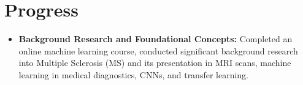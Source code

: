\documentclass[11pt]{article}
\begin{document}
\section*{Progress}\label{progress}
\begin{itemize}
    \item \textbf{Background Research and Foundational Concepts:} Completed an online machine learning course, conducted significant background research into Multiple Sclerosis (MS) and its presentation in MRI scans, machine learning in medical diagnostics, CNNs, and transfer learning.

\end{itemize}
\end{document}

